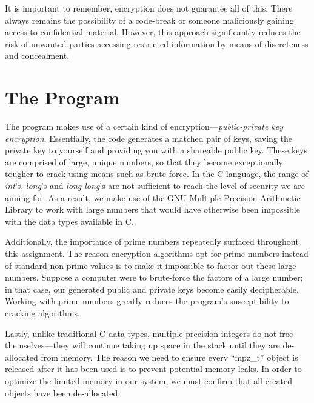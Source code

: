 \documentclass[12pt]{article}
\begin{document}
\vspace{0.2in}

It is important to remember, encryption does not guarantee all of this. There always remains the possibility of a code-break or someone maliciously gaining access to confidential material. However, this approach significantly reduces the risk of unwanted parties accessing restricted information by means of discreteness and concealment.

\section{The Program}

The program makes use of a certain kind of encryption---\textit{public-private key encryption}. Essentially, the code generates a matched pair of keys, saving the private key to yourself and providing you with a shareable public key. These keys are comprised of large, unique numbers, so that they become exceptionally tougher to crack using means such as brute-force. In the C language, the range of \textit{int}'s, \textit{long}'s and \textit{long long}'s are not sufficient to reach the level of security we are aiming for. As a result, we make use of the GNU Multiple Precision Arithmetic Library to work with large numbers that would have otherwise been impossible with the data types available in C.

\vspace{0.2in}

Additionally, the importance of prime numbers repeatedly surfaced throughout this assignment. The reason encryption algorithms opt for prime numbers instead of standard non-prime values is to make it impossible to factor out these large numbers. Suppose a computer were to brute-force the factors of a large number; in that case, our generated public and private keys become easily decipherable. Working with prime numbers greatly reduces the program's susceptibility to cracking algorithms.

\vspace{0.2in}

Lastly, unlike traditional C data types, multiple-precision integers do not free themselves---they will continue taking up space in the stack until they are de-allocated from memory. The reason we need to ensure every \enquote{mpz\_t} object is released after it has been used is to prevent potential memory leaks. In order to optimize the limited memory in our system, we must confirm that all created objects have been de-allocated.
\end{document}
